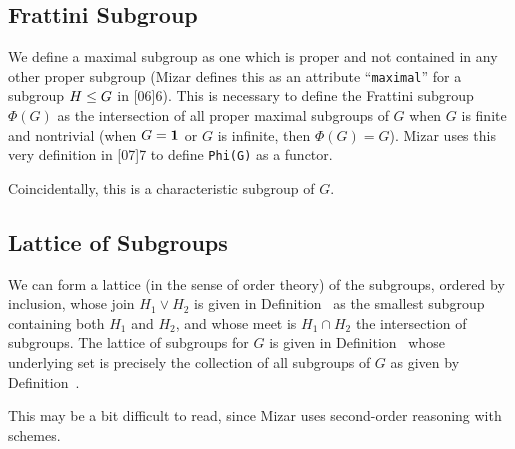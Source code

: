 \subsection{Frattini Subgroup}
We define a maximal subgroup as one which is proper and not contained in
any other proper subgroup (Mizar defines this as an attribute ``\lstinline{maximal}'' for a
subgroup $H\leq G$ in [06]{6}).
This is necessary to define the Frattini subgroup $\Phi(G)$ as the
intersection of all proper maximal subgroups of $G$ when $G$ is finite
and nontrivial (when $G=\mathbf{1}$ or $G$ is infinite, then
$\Phi(G)=G$). Mizar uses this very definition in
[07]{7} to define \lstinline{Phi(G)}
as a functor.

Coincidentally, this is a characteristic subgroup of $G$.

\subsection{Lattice of Subgroups}
We can form a lattice (in the sense of order theory) of the subgroups,
ordered by inclusion, whose join $H_{1}\lor H_{2}$ is given in
Definition~ as the smallest subgroup
containing both $H_{1}$ and $H_{2}$, and whose meet is $H_{1}\cap H_{2}$
the intersection of subgroups. The lattice of subgroups for $G$ is given
in Definition~ whose underlying set is precisely the
collection of all subgroups of $G$ as given by Definition~.

This may be a bit difficult to read, since Mizar uses second-order
reasoning with schemes.
